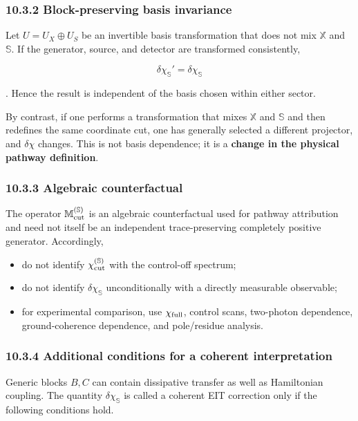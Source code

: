 \documentclass[
  10pt,
  a4paper,
]{article}
\providecommand{\tightlist}{%
  \setlength{\itemsep}{0pt}\setlength{\parskip}{0pt}}
\begin{document}
\subsubsection{10.3.2 Block-preserving basis
invariance}\label{block-preserving-basis-invariance}

Let \(U=U_X\oplus U_S\) be an invertible basis transformation that does
not mix \(\mathbb X\) and \(\mathbb S\). If the generator, source, and
detector are transformed consistently,

\[
\boxed{
\delta\chi_{\mathbb S}'=\delta\chi_{\mathbb S}
}
\]

. Hence the result is independent of the basis chosen within either
sector.

By contrast, if one performs a transformation that mixes \(\mathbb X\)
and \(\mathbb S\) and then redefines the same coordinate cut, one has
generally selected a different projector, and \(\delta\chi\) changes.
This is not basis dependence; it is a \textbf{change in the physical
pathway definition}.

\subsubsection{10.3.3 Algebraic
counterfactual}\label{algebraic-counterfactual}

The operator \(\mathbb M_{\rm cut}^{(\mathbb S)}\) is an algebraic
counterfactual used for pathway attribution and need not itself be an
independent trace-preserving completely positive generator. Accordingly,

\begin{itemize}
\tightlist
\item
  do not identify \(\chi_{\rm cut}^{(\mathbb S)}\) with the control-off
  spectrum;
\item
  do not identify \(\delta\chi_{\mathbb S}\) unconditionally with a
  directly measurable observable;
\item
  for experimental comparison, use \(\chi_{\rm full}\), control scans,
  two-photon dependence, ground-coherence dependence, and pole/residue
  analysis.
\end{itemize}

\subsubsection{10.3.4 Additional conditions for a coherent
interpretation}\label{additional-conditions-for-a-coherent-interpretation}

Generic blocks \(B,C\) can contain dissipative transfer as well as
Hamiltonian coupling. The quantity \(\delta\chi_{\mathbb S}\) is called
a coherent EIT correction only if the following conditions hold.
\end{document}
